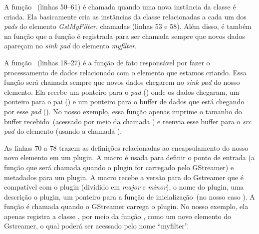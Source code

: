 A função ~(linhas 50--61) é chamada quando uma nova
instância da classe  é criada.  Ela basicamente cria as
instâncias da classe  relacionadas a cada um dos \emph{pads} do
elemento \emph{GstMyFilter}, chamadas 
(linhas 53 e 58).  Além disso, é também na função  que a
função  é registrada para ser chamada sempre que
novos dados apareçam no \emph{sink pad} do elemento \emph{myfilter}.

A função ~(linhas 18--27) é a função de fato responsável
por fazer o processamento de dados relacionado com o elemento que estamos
criando.  Essa função será chamada sempre que novos dados chegarem no
\emph{sink pad} do nosso elemento.  Ela recebe um ponteiro para o \emph{pad}
() onde os dados chegaram, um ponteiro para o pai () e
um ponteiro para o buffer de dados que está chegando por esse \emph{pad}
().  No nosso exemplo, essa função apenas imprime o tamanho do
buffer recebido~(acessado por meio da chamada ) e
reenvia esse buffer para o \emph{src pad} do elemento (usando a chamada
).


As linhas 70 a 78 trazem as definições relacionadas ao encapsulamento do nosso
novo elemento em um plugin.  A macro  é usada para
definir o ponto de entrada (a função que será chamada quando o plugin for
carregado pelo GStreamer) e metadados para um plugin.  A macro recebe a versão
para do Gstreamer que é compatível com o  plugin (dividido em \emph{major} e
\emph{minor}), o nome do plugin, uma descrição o plugin, um ponteiro para a
função de inicialização~(no nosso caso ).  A função 
 é chamada quando o GStreamer carrega o plugin.  No
nosso exemplo, ela apenas registra a classe , por meio da função
, como um novo elemento do Gstreamer, o qual poderá ser
acessado pelo nome ``myfilter''.



